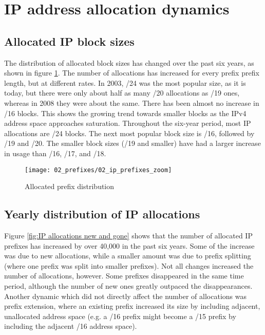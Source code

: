 \section{IP address allocation dynamics}
\label{sec:allocations}

\subsection{Allocated IP block sizes}

The distribution of allocated block sizes has changed over the past six years,
as shown in figure \ref{fig:IP allocations}. The number of allocations has
increased for every prefix prefix length, but at different rates. In 2003, /24
was the most popular size, as it is today, but there were only about half as
many /20 allocations as /19 ones, whereas in 2008 they were about the same.
There has been almost no increase in /16 blocks. This shows the growing trend towards smaller blocks as the IPv4 address space approaches saturation.
Throughout the six-year period, most IP allocations are /24 blocks. The next most popular block size is /16, followed by /19 and /20. The smaller block sizes (/19 and smaller) have had a larger increase in usage than /16, /17, and /18.

\begin{figure}[htbp]
 	\centering
 		\texttt{[image: 02\_prefixes/02\_ip\_prefixes\_zoom]}
	\caption{Allocated prefix distribution}
 	\label{fig:IP allocations}
\end{figure}

\subsection{Yearly distribution of IP allocations}


Figure \ref{fig:IP allocations new and gone} shows that the number of allocated IP prefixes has increased by over 40,000 in the past six years. Some of the increase was due to new allocations, while a smaller amount was due to prefix splitting (where one prefix was split into smaller prefixes). Not all changes increased the number of allocations, however. Some prefixes disappeared in the same time period, although the number of new ones greatly outpaced the disappearances. Another 
dynamic which did not directly affect the number of allocations was prefix extension, where an existing prefix increased its size by including adjacent, unallocated address space (e.g. a /16 prefix might become a /15 prefix by
including the adjacent /16 address space).

